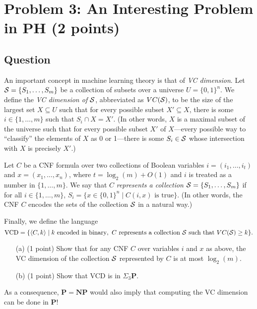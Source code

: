 \documentclass{article}
\renewcommand{\P}{\mathbf{P}}
\newcommand{\NP}{\mathbf{NP}}
\begin{document}

\newpage
\section*{Problem 3: An Interesting Problem in PH (2 points)}

\subsection*{Question}
An important concept in machine learning theory is that of \emph{VC dimension}.
Let ${\cal S} = \{S_1,\ldots,S_m\}$ be a collection of subsets over a universe $U = \{0,1\}^n$. We define the \emph{VC dimension of $\cal S$}, abbreviated as $VC({\cal S})$, to be the size of the largest set $X \subseteq U$ such that for every possible subset $X' \subseteq X$, there is some $i \in \{1,\ldots,m\}$ such that $S_i \cap X = X'$. (In other words, $X$ is a maximal subset of the universe such that for every possible subset $X'$ of $X$---every possible way to ``classify'' the elements of $X$ as 0 or 1---there is some $S_i \in {\cal S}$ whose intersection with $X$ is precisely $X'$.) 

Let $C$ be a CNF formula over two collections of Boolean variables $i = (i_1,\ldots,i_t)$ and $x = (x_1,\ldots,x_n)$, where $t = \log_2(m)+O(1)$ and $i$ is treated as a number in $\{1,\ldots,m\}$. We say that $C$ \emph{represents a collection ${\cal S} = \{S_1,\ldots,S_m\}$} if for all $i\in\{1,\ldots,m\}$, $S_i = \{x \in \{0,1\}^n \mid C(i,x)\text{ is true}\}$. (In other words, the CNF $C$ encodes the sets of the collection ${\cal S}$ in a natural way.)

Finally, we define the language
\[\text{VCD} = \{ \langle C,k\rangle \mid k \text{ encoded in binary},~ C \text{ represents a collection $\cal S$ such that $VC({\cal S})\geq k$} \}.\]

\begin{enumerate}
\item[(a)] (1 point) Show that for any CNF $C$ over variables $i$ and $x$ as above, the VC dimension of the collection $\cal S$ represented by $C$ is at most $\log_2(m)$.

\item[(b)] (1 point) Show that VCD is in $\Sigma_3 \P$.
\end{enumerate}

\noindent As a consequence, $\P = \NP$ would also imply that computing the VC dimension can be done in $\P$!
\end{document}
